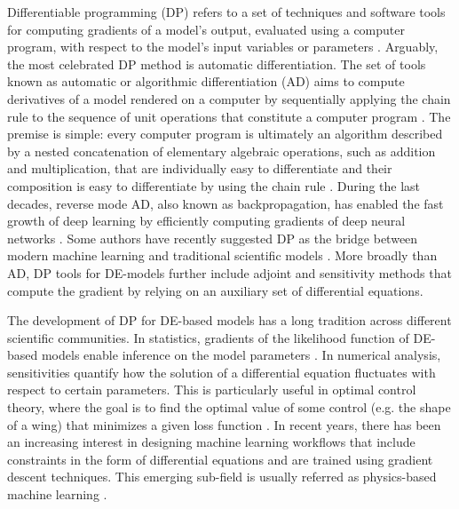 Differentiable programming (DP) refers to a set of techniques and software tools for computing gradients of a model's output, evaluated using a computer program, with respect to the model's input variables or parameters \cite{Shen_diff_modelling, Innes_Zygote, blondel2024elements}.
Arguably, the most celebrated DP method is automatic differentiation.
The set of tools known as automatic or algorithmic differentiation (AD) aims to compute derivatives of a model rendered on a computer by sequentially applying the chain rule to the sequence of unit operations that constitute a computer program \cite{Griewank:2008kh, Naumann.2011}. 
The premise is simple: every computer program is ultimately an algorithm described by a nested concatenation of elementary algebraic operations, such as addition and multiplication, that are individually easy to differentiate and their composition is easy to differentiate by using the chain rule \cite{Giering:1998in}. 
During the last decades, reverse mode AD, also known as backpropagation, has enabled the fast growth of deep learning by efficiently computing gradients of deep neural networks \cite{griewank2012invented}.
Some authors have recently suggested DP as the bridge between modern machine learning and traditional scientific models \cite{Ramsundar_Krishnamurthy_Viswanathan_2021, Shen_diff_modelling, Gelbrecht-differential-programming-Earth, rackauckas2021generalized}. 
More broadly than AD, DP tools for DE-models further include adjoint and sensitivity methods that compute the gradient by relying on an auxiliary set of differential equations.


The development of DP for DE-based models has a long tradition across different scientific communities.
In statistics, gradients of the likelihood function of DE-based models enable inference on the model parameters \cite{ramsay2017dynamic}. 
In numerical analysis, sensitivities quantify how the solution of a differential equation fluctuates with respect to certain parameters. 
This is particularly useful in optimal control theory, where the goal is to find the optimal value of some control (e.g. the shape of a wing) that minimizes a given loss function \cite{Giles_Pierce_2000}. 
In recent years, there has been an increasing interest in designing machine learning workflows that include constraints in the form of differential equations and are trained using gradient descent techniques.
This emerging sub-field is usually referred as physics-based machine learning \cite{Karniadakis_Kevrekidis_Lu_Perdikaris_Wang_Yang_2021, thuerey2021pbdl}.

